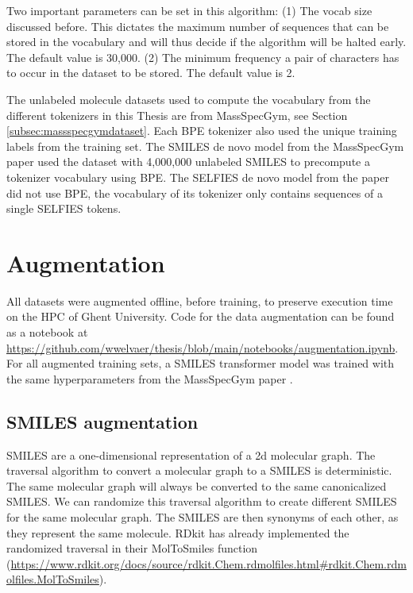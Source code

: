 Two important parameters can be set in this algorithm:
(1) The vocab size discussed before. This dictates the maximum number of sequences that can be stored in the vocabulary and will thus decide if the algorithm will be halted early. The default value is 30,000.
(2) The minimum frequency a pair of characters has to occur in the dataset to be stored. The default value is 2.

The unlabeled molecule datasets used to compute the vocabulary from the different tokenizers in this Thesis are from MassSpecGym, see Section \ref{subsec:massspecgymdataset}.
Each \ac{BPE} tokenizer also used the unique training labels from the training set.
The SMILES de novo model from the MassSpecGym paper \cite{bushuiev2024massspecgym} used the dataset with 4,000,000 unlabeled SMILES to precompute a tokenizer vocabulary using \ac{BPE}.
The SELFIES de novo model from the paper did not use \ac{BPE}, the vocabulary of its tokenizer only contains sequences of a single SELFIES tokens.

\section{Augmentation}
\label{sec:augmentation}

All datasets were augmented offline, before training, to preserve execution time on the \ac{HPC} of Ghent University.
Code for the data augmentation can be found as a notebook at \url{https://github.com/wwelvaer/thesis/blob/main/notebooks/augmentation.ipynb}.
For all augmented training sets, a SMILES transformer model was trained with the same hyperparameters from the MassSpecGym paper \cite{bushuiev2024massspecgym}.

\subsection{SMILES augmentation}

SMILES are a one-dimensional representation of a 2d molecular graph.
The traversal algorithm to convert a molecular graph to a SMILES is deterministic.
The same molecular graph will always be converted to the same canonicalized SMILES.
We can randomize this traversal algorithm to create different SMILES for the same molecular graph.
The SMILES are then synonyms of each other, as they represent the same molecule.
RDkit has already implemented the randomized traversal in their MolToSmiles function (\url{https://www.rdkit.org/docs/source/rdkit.Chem.rdmolfiles.html#rdkit.Chem.rdmolfiles.MolToSmiles}).

